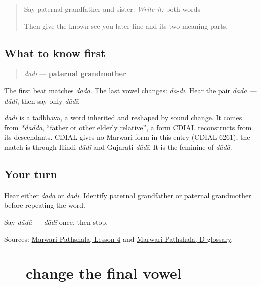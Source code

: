 \label{lesson:MW-C08-hear-dadi}



\begin{quote}
Say paternal grandfather and sister. \emph{Write it:} both words

Then give the known see-you-later line and its two meaning parts.
\end{quote}

\subsection*{What to know first}
\begin{quote}
\emph{dādī} — \textbf{paternal grandmother}
\end{quote}

The first beat matches \emph{dādā}. The last vowel changes: \emph{dā-dī}. Hear the pair \emph{dādā — dādī}, then say only \emph{dādī}.

\begin{cousinweb}
\emph{dādī} is a tadbhava, a word inherited and reshaped by sound change. It comes from \emph{*dādda}, \textquotedblleft{}father or other elderly relative\textquotedblright{}, a form CDIAL reconstructs from its descendants. CDIAL gives no Marwari form in this entry (CDIAL 6261); the match is through Hindi \emph{dādī} and Gujarati \emph{dādī}. It is the feminine of \emph{dādā}.
\end{cousinweb}

\subsection*{Your turn}
Hear either \emph{dādā} or \emph{dādī}. Identify paternal grandfather or paternal grandmother before repeating the word.

\begin{tcolorbox}[breakable,colback=teal!4,colframe=teal!35!black,title={Before you move on}]
Say \emph{dādā — dādī} once, then stop.

Sources: \href{https://www.marwaripathshala.com/marwari-lesson-4-english}{Marwari Pathshala, Lesson 4} and \href{https://www.marwaripathshala.com/d-glossary-of-rajasthani-language}{Marwari Pathshala, D glossary}.
\end{tcolorbox}
\section[\texorpdfstring{\mw{दादी} (dādī)}{दादी (dādī)}]{ — change the final vowel}

